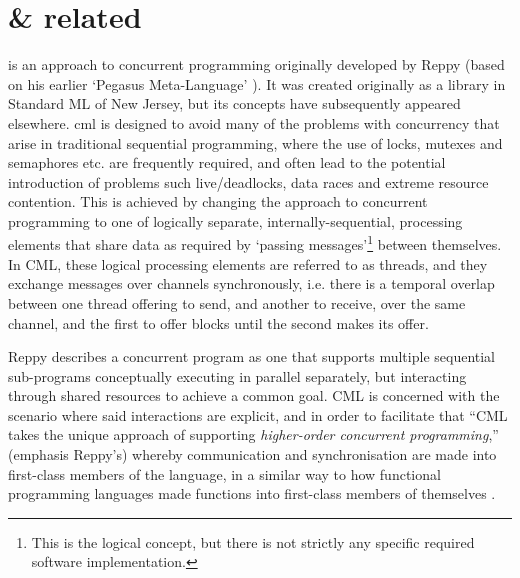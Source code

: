 \section{ \& related}

 \cite{Reppy1991,Panangaden1997} is an approach to concurrent programming originally developed by Reppy (based on his earlier `Pegasus Meta-Language' \cite{Reppy1988}).  It was created originally as a library in Standard ML of New Jersey, but its concepts have subsequently appeared elsewhere.   \Gls{cml} is designed to avoid many of the problems with concurrency that arise in traditional sequential programming, where the use of locks, mutexes and semaphores etc. are frequently required, and often lead to the potential introduction of problems such live/deadlocks, data races and extreme resource contention.  This is achieved by changing the approach to concurrent programming to one of logically separate, internally-sequential, processing elements that share data as required by `passing messages'\footnote{This is the logical concept, but there is not strictly any specific required software implementation.} between themselves.  In CML, these logical processing elements are referred to as threads, and they exchange messages over channels synchronously, i.e. there is a temporal overlap between one thread offering to send, and another to receive, over the same channel, and the first to offer blocks until the second makes its offer.%

Reppy describes a concurrent program as one that supports multiple sequential sub-programs conceptually executing in parallel separately, but interacting through shared resources to achieve a common goal.  CML is concerned with the scenario where said interactions are explicit, and in order to facilitate that ``CML takes the unique approach of supporting \emph{higher-order concurrent programming},'' (emphasis Reppy's) whereby communication and synchronisation are made into first-class members of the language, in a similar way to how functional programming languages made functions into first-class members of themselves \cite[Preface]{Reppy2007}.

